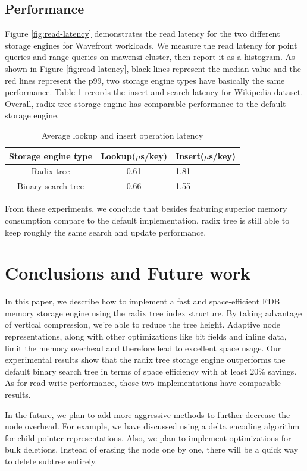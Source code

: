 \documentclass[sigplan,screen,nonacm]{acmart}
\begin{document}
\subsection{Performance}
Figure \ref{fig:read-latency} demonstrates the read latency for the two different storage engines for Wavefront workloads. We measure the read latency for point queries and range queries on mawenzi cluster, then report it as a histogram. As shown in Figure \ref{fig:read-latency}, black lines represent the median value and the red lines represent the p99, two storage engine types have basically the same performance. Table \ref{tab:wiki-latency} records the insert and search latency for Wikipedia dataset. Overall, radix tree storage engine has comparable performance to the default storage engine. 

\begin{table}[h]
  \caption{Average lookup and insert operation latency}
  \begin{tabular}{ccl}
    \toprule
    Storage engine type&Lookup($\mu$s/key)&Insert($\mu$s/key)\\
    \midrule
    Radix tree & 0.61 & 1.81\\
    Binary search tree & 0.66 & 1.55\\
    \bottomrule
  \end{tabular}
  \label{tab:wiki-latency}
\end{table}

From these experiments, we conclude that besides featuring superior memory consumption compare to the default implementation, radix tree is still able to keep roughly the same search and update performance. 

\section{Conclusions and Future work}
In this paper, we describe how to implement a fast and space-efficient FDB memory storage engine using the radix tree index structure. By taking advantage of vertical compression, we’re able to reduce the tree height. Adaptive node representations, along with other optimizations like bit fields and inline data, limit the memory overhead and therefore lead to excellent space usage. Our experimental results show that the radix tree storage engine outperforms the default binary search tree in terms of space efficiency with at least 20\% savings. As for read-write performance, those two implementations have comparable results. 

In the future, we plan to add more aggressive methods to further decrease the node overhead. For example, we have discussed using a delta encoding algorithm for child pointer representations. Also, we plan to implement optimizations for bulk deletions. Instead of erasing the node one by one, there will be a quick way to delete subtree entirely.   



\end{document}
